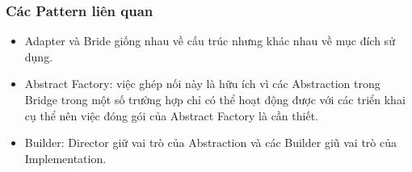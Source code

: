 \subsubsection{Các Pattern liên quan}
\begin{itemize}
    \item Adapter và Bride giống nhau về cấu trúc nhưng khác nhau về mục đích sử dụng.
    \item Abstract Factory: việc ghép nối này là hữu ích vì các Abstraction trong Bridge trong một số trường hợp chỉ có thể hoạt động được với các triển khai cụ thể nên việc đóng gói của Abstract Factory là cần thiết.
    \item Builder: Director giữ vai trò của Abstraction và các Builder giũ vai trò của Implementation.
\end{itemize}